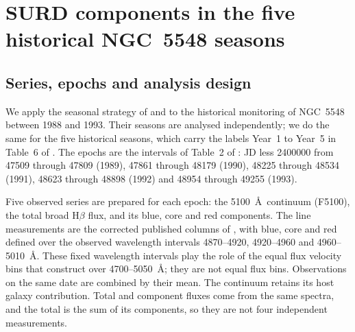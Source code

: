\providecommand{\SURDResultsPath}{collaborator_rebuild/results_section}
\providecommand{\SURDEpochPath}{collaborator_rebuild/epoch_results}

\section{SURD components in the five historical NGC~5548 seasons}
\label{sec:epoch_surd_results}

\subsection{Series, epochs and analysis design}

We apply the seasonal strategy of \citet{Lu2022} and \citet{Xi2025} to the
historical monitoring of NGC~5548 between 1988 and 1993. Their seasons are
analysed independently; we do the same for the five historical seasons, which
carry the labels Year~1 to Year~5 in Table~6 of \citet{Lu2022}. The epochs are the
intervals of Table~2 of \citet{Peterson2004ApJ}: JD less 2400000 from 47509
through 47809 (1989), 47861 through 48179 (1990), 48225 through 48534 (1991),
48623 through 48898 (1992) and 48954 through 49255 (1993).

Five observed series are prepared for each epoch: the 5100~\AA\ continuum
(F5100), the total broad H$\beta$ flux, and its blue, core and red components.
The line measurements are the corrected published columns of
\citet{WandersPeterson1996}, with blue, core and red defined over the observed
wavelength intervals 4870--4920, 4920--4960 and 4960--5010~\AA. These fixed
wavelength intervals play the role of the equal flux velocity bins that
\citet{Xi2025} construct over 4700--5050~\AA; they are not equal flux bins.
Observations on the same date are combined by their mean. The continuum retains
its host galaxy contribution. Total and component fluxes come from the same
spectra, and the total is the sum of its components, so they are not four
independent measurements.

